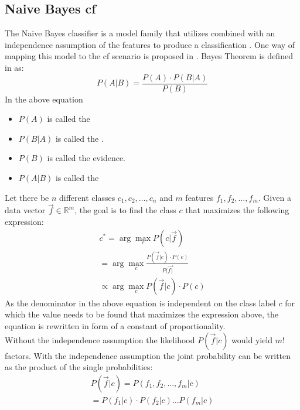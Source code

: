 \subsection{Naive Bayes \acrshort{cf}}
The Naive Bayes classifier is a model family that utilizes  combined with an independence assumption of the features to produce a classification \cite{rish2001empirical}. One way of mapping this model to the \acrshort{cf} scenario is proposed in \cite{valdiviezo2019collaborative}. Bayes Theorem is defined in \cite{berrar2018bayes} as:\\
\begin{equation}
    P(A|B) = \frac{P(A)\cdot P(B|A)}{P(B)}
\end{equation}
In the above equation
\begin{itemize}
    \item $P(A)$ is called the 
    \item $P(B|A)$ is called the .
    \item $P(B)$ is called the evidence.
    \item $P(A|B)$ is called the 
\end{itemize}
Let there be $n$ different classes $c_1, c_2,\dots,c_n$ and $m$ features $f_1, f_2,\dots,f_m$.
Given a data vector $\Vec{f} \in \mathbb{R}^{m}$, the goal is to find the class $c$ that maximizes the following expression:\\
\begin{equation}
    \begin{align*}
        c^{*} = \arg\max_{c} P(c|\Vec{f})\\
        = \arg\max_{c} \frac{P(\Vec{f}|c)\cdot P(c)}{P(\Vec{f)}}\\
        \propto \arg\max_{c} P(\Vec{f}|c)\cdot P(c) \label{eq:1}  
    \end{align*}
\end{equation}
As the denominator in the above equation is independent on the class label $c$ for which the value needs to be found that maximizes the expression above, the equation is rewritten in form of a constant of proportionality.\\
Without the independence assumption the likelihood $P(\Vec{f}|c)$ would yield $m!$ factors.
With the independence assumption the joint probability can be written as the product of the single probabilities:
\begin{equation}
    \begin{align*}
        P(\Vec{f}|c) = P(f_1, f_2,\dots, f_m|c)\\
        = P(f_1|c)\cdot P(f_2|c) \dots P(f_m|c)
    \end{align*}
\end{equation}
